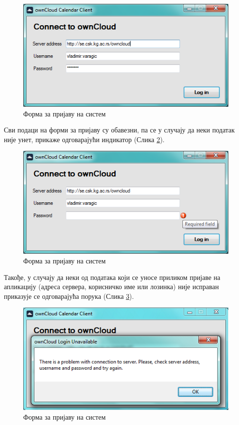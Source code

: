 \begin{figure}[H]
	\centering
	\includegraphics[scale=0.5]{slike/logInForm.png}
	\caption{Форма за пријаву на систем}
	\label{fig:login_form}
\end{figure}

Сви подаци на форми за пријаву су обавезни, па се у случају да неки податак није унет, прикаже одговарајући индикатор (Слика \ref{fig:login_form_required}).

\begin{figure}[H]
	\centering
	\includegraphics[scale=0.5]{slike/LogInFormReqiredFields.png}
	\caption{Форма за пријаву на систем}
	\label{fig:login_form_required}
\end{figure}

Такође, у случају да неки од података који се уносе приликом пријаве на апликацију (адреса сервера, корисничко име или лозинка) није исправан приказује се одговарајућа порука (Слика \ref{fig:login_form_failed}).

\begin{figure}[H]
	\centering
	\includegraphics[scale=0.5]{slike/logInFailed.png}
	\caption{Форма за пријаву на систем}
	\label{fig:login_form_failed}
\end{figure}

